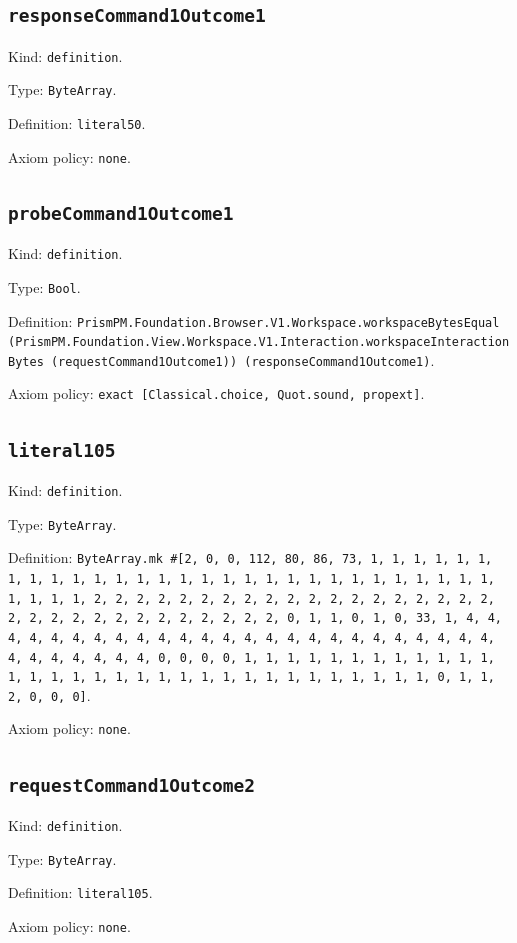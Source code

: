 \documentclass[11pt]{article}
\begin{document}
\subsection*{\texttt{responseCommand1Outcome1}}
\noindent Kind: \texttt{definition}.\par
\noindent Type: \texttt{ByteArray}.\par
\noindent Definition: \texttt{literal50}.\par
\noindent Axiom policy: \texttt{none}.\par
\subsection*{\texttt{probeCommand1Outcome1}}
\noindent Kind: \texttt{definition}.\par
\noindent Type: \texttt{Bool}.\par
\noindent Definition: \texttt{PrismPM.Foundation.Browser.V1.Workspace.workspaceBytesEqual (PrismPM.Foundation.View.Workspace.V1.Interaction.workspaceInteractionBytes (requestCommand1Outcome1)) (responseCommand1Outcome1)}.\par
\noindent Axiom policy: \texttt{exact [Classical.choice, Quot.sound, propext]}.\par
\subsection*{\texttt{literal105}}
\noindent Kind: \texttt{definition}.\par
\noindent Type: \texttt{ByteArray}.\par
\noindent Definition: \texttt{ByteArray.mk \#[2, 0, 0, 112, 80, 86, 73, 1, 1, 1, 1, 1, 1, 1, 1, 1, 1, 1, 1, 1, 1, 1, 1, 1, 1, 1, 1, 1, 1, 1, 1, 1, 1, 1, 1, 1, 1, 1, 1, 1, 2, 2, 2, 2, 2, 2, 2, 2, 2, 2, 2, 2, 2, 2, 2, 2, 2, 2, 2, 2, 2, 2, 2, 2, 2, 2, 2, 2, 2, 2, 2, 2, 0, 1, 1, 0, 1, 0, 33, 1, 4, 4, 4, 4, 4, 4, 4, 4, 4, 4, 4, 4, 4, 4, 4, 4, 4, 4, 4, 4, 4, 4, 4, 4, 4, 4, 4, 4, 4, 4, 4, 4, 0, 0, 0, 0, 1, 1, 1, 1, 1, 1, 1, 1, 1, 1, 1, 1, 1, 1, 1, 1, 1, 1, 1, 1, 1, 1, 1, 1, 1, 1, 1, 1, 1, 1, 1, 1, 0, 1, 1, 2, 0, 0, 0]}.\par
\noindent Axiom policy: \texttt{none}.\par
\subsection*{\texttt{requestCommand1Outcome2}}
\noindent Kind: \texttt{definition}.\par
\noindent Type: \texttt{ByteArray}.\par
\noindent Definition: \texttt{literal105}.\par
\noindent Axiom policy: \texttt{none}.\par
\end{document}
